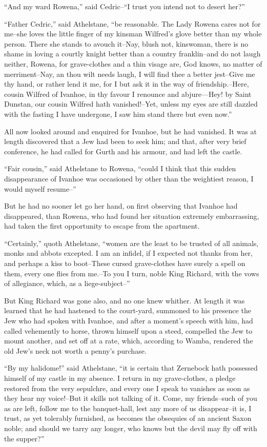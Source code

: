 ``And my ward Rowena,'' said Cedric--``I trust you intend not to desert
her?''

``Father Cedric,'' said Athelstane, ``be reasonable. The Lady Rowena
cares not for me--she loves the little finger of my kinsman Wilfred's
glove better than my whole person. There she stands to avouch it--Nay,
blush not, kinswoman, there is no shame in loving a courtly knight
better than a country franklin--and do not laugh neither, Rowena, for
grave-clothes and a thin visage are, God knows, no matter of
merriment--Nay, an thou wilt needs laugh, I will find thee a better
jest--Give me thy hand, or rather lend it me, for I but ask it in the
way of friendship.--Here, cousin Wilfred of Ivanhoe, in thy favour I
renounce and abjure---Hey! by Saint Dunstan, our cousin Wilfred hath
vanished!--Yet, unless my eyes are still dazzled with the fasting I have
undergone, I saw him stand there but even now.''

All now looked around and enquired for Ivanhoe, but he had vanished. It
was at length discovered that a Jew had been to seek him; and that,
after very brief conference, he had called for Gurth and his armour, and
had left the castle.

``Fair cousin,'' said Athelstane to Rowena, ``could I think that this
sudden disappearance of Ivanhoe was occasioned by other than the
weightiest reason, I would myself resume--''

But he had no sooner let go her hand, on first observing that Ivanhoe
had disappeared, than Rowena, who had found her situation extremely
embarrassing, had taken the first opportunity to escape from the
apartment.

``Certainly,'' quoth Athelstane, ``women are the least to be trusted of
all animals, monks and abbots excepted. I am an infidel, if I expected
not thanks from her, and perhaps a kiss to boot--These cursed
grave-clothes have surely a spell on them, every one flies from me.--To
you I turn, noble King Richard, with the vows of allegiance, which, as a
liege-subject--''

But King Richard was gone also, and no one knew whither. At length it
was learned that he had hastened to the court-yard, summoned to his
presence the Jew who had spoken with Ivanhoe, and after a moment's
speech with him, had called vehemently to horse, thrown himself upon a
steed, compelled the Jew to mount another, and set off at a rate, which,
according to Wamba, rendered the old Jew's neck not worth a penny's
purchase.

``By my halidome!'' said Athelstane, ``it is certain that Zernebock hath
possessed himself of my castle in my absence. I return in my
grave-clothes, a pledge restored from the very sepulchre, and every one
I speak to vanishes as soon as they hear my voice!--But it skills not
talking of it. Come, my friends--such of you as are left, follow me to
the banquet-hall, lest any more of us disappear--it is, I trust, as yet
tolerably furnished, as becomes the obsequies of an ancient Saxon noble;
and should we tarry any longer, who knows but the devil may fly off with
the supper?''

